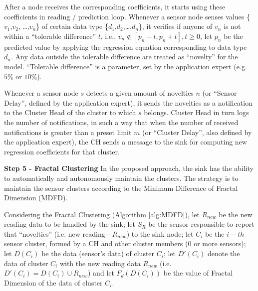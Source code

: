 \documentclass{acm_proc_article-sp}
\begin{document}
After a node receives the corresponding coefficients, it starts using these
coefficients in reading / prediction loop.
Whenever a sensor node senses values \{$v_{1}$,$v_{2}$, \ldots,$v_{n}$\} of
certain data type \{$d_{1}$,$d_{2}$,\ldots,$d_{n}$\}, it verifies if anyone of
$v_{n}$ is not within a ``tolerable difference'' $t$, i.e., $v_{n} \not \in
[p_{n}-t,p_{n}+t], t \geq 0$, let $p_{n}$ be the predicted value by applying
the regression equation corresponding to data type $d_{n}$. Any data outside the
tolerable difference are treated as ``novelty'' for the model.
``Tolerable difference'' is a parameter, set by the application expert (e.g.
$5\%$ or $10\%$).
\vspace*{-.3cm}

Whenever a sensor node $s$ detects a given amount of novelties $n$ (or ``Sensor
Delay'', defined by the application expert), it sends the novelties as a
notification to the Cluster Head of the cluster to which $s$ belongs. 
Cluster Head in turn logs the number of notifications, in such a way that when
the number of received notifications is greater than a preset limit $m$ (or
``Cluster Delay'', also defined by the application expert), the CH sends a
message to the sink for computing new regression coefficients for that cluster.
\vspace*{-.3cm}

{\bf Step 5 - Fractal Clustering}
In the proposed approach, the sink has the ability to automatically and
autonomously maintain the clusters. The strategy is to maintain the sensor
clusters according to the Minimum Difference of Fractal Dimension (MDFD).
\vspace*{-.3cm}

Considering the Fractal Clustering (Algorithm \ref{alg:MDFD}), let $R_{new}$ be
the new reading data to be handled by the sink; let $S_{R}$ be the sensor
responsible to report that ``novelties'' (i.e. new reading - $R_{new}$) to the
sink node; let $C_i$ be the $i-th$ sensor cluster, formed by a CH and other
cluster members (0 or more sensors); let $D(C_i)$ be the data (sensor's data) of
cluster $C_i$; let $D'(C_i)$ denote the data of cluster $C_i$ with the new
reading data $R_{new}$ (i.e. $D'(C_i) = D(C_i) \cup R_{new}$) and let
$F_{d}(D(C_i))$ be the value of Fractal Dimension of the data of cluster $C_i$.
\vspace*{-.3cm}
\end{document}
